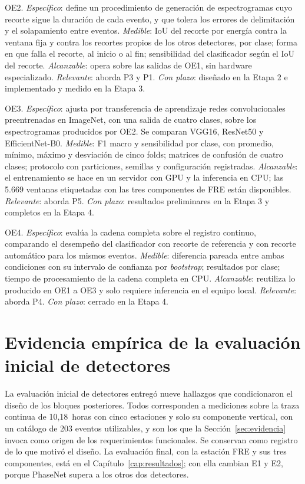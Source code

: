 OE2. \emph{Específico}: define un procedimiento de generación de
espectrogramas cuyo recorte sigue la duración de cada evento, y que tolera los
errores de delimitación y el solapamiento entre eventos. \emph{Medible}: IoU
del recorte por energía contra la ventana fija y contra los recortes propios de
los otros detectores, por clase; forma en que falla el recorte, al inicio o al
fin; sensibilidad del clasificador según el IoU del recorte.
\emph{Alcanzable}: opera sobre las salidas de OE1, sin hardware
especializado. \emph{Relevante}: aborda P3 y P1. \emph{Con plazo}: diseñado en
la Etapa 2 e implementado y medido en la Etapa 3.

OE3. \emph{Específico}: ajusta por transferencia de aprendizaje redes
convolucionales preentrenadas en ImageNet, con una salida de cuatro clases,
sobre los espectrogramas producidos por OE2. Se comparan VGG16, ResNet50 y
EfficientNet-B0. \emph{Medible}: F1 macro y sensibilidad por clase, con
promedio, mínimo, máximo y desviación de cinco folds; matrices de confusión de
cuatro clases; protocolo con particiones, semillas y configuración registradas.
\emph{Alcanzable}: el entrenamiento se hace en un servidor con GPU y la
inferencia en CPU; las 5.669 ventanas etiquetadas con las tres componentes de
FRE están disponibles. \emph{Relevante}: aborda P5. \emph{Con plazo}:
resultados preliminares en la Etapa 3 y completos en la Etapa 4.

OE4. \emph{Específico}: evalúa la cadena completa sobre el registro continuo,
comparando el desempeño del clasificador con recorte de referencia y con
recorte automático para los mismos eventos. \emph{Medible}: diferencia pareada
entre ambas condiciones con su intervalo de confianza por \emph{bootstrap};
resultados por clase; tiempo de procesamiento de la cadena completa en CPU.
\emph{Alcanzable}: reutiliza lo producido en OE1 a OE3 y solo requiere
inferencia en el equipo local. \emph{Relevante}: aborda P4. \emph{Con plazo}:
cerrado en la Etapa 4.


\section{Evidencia empírica de la evaluación inicial de detectores}
\label{sec:anexo-evidencia}

La evaluación inicial de detectores entregó nueve hallazgos que condicionaron
el diseño de los bloques posteriores. Todos corresponden a mediciones sobre la
traza continua de 10,18~horas con cinco estaciones y solo su componente
vertical, con un catálogo de 203 eventos utilizables, y son los que la
Sección~\ref{sec:evidencia} invoca como origen de los requerimientos
funcionales. Se conservan como registro de lo que motivó el diseño. La
evaluación final, con la estación FRE y sus tres componentes, está en el
Capítulo~\ref{cap:resultados}; con ella cambian E1 y E2, porque PhaseNet supera
a los otros dos detectores.

